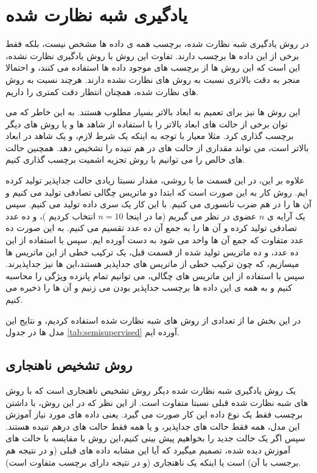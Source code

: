 \section{یادگیری شبه نظارت شده}

در روش یادگیری شبه نظارت شده، برچسب همه ی داده ها مشخص نیست، بلکه فقط برخی از این داده ها برچسب دارند. تفاوت این روش با روش یادگیری نظارت نشده، این است که این روش ها از برچسب های موجود داده ها استفاده می کنند، و احتمالا منجر به دقت بالاتری نسبت به روش های نظارت نشده دارند. هرچند نسبت به روش های نظارت شده، همچنان انتظار دقت  کمتری را داریم.

این روش ها نیز برای تعمیم به ابعاد بالاتر بسیار مطلوب هستند. به این خاطر که می توان برخی از حالت های ابعاد بالاتر را با استفاده از شاهد ها و یا روش های دیگر برچسب گذاری کرد. مثلا معیار
با توجه به اینکه یک شرط لازم، و یک شاهد در ابعاد بالاتر است، می تواند مقداری از حالت های در هم تنیده را تشخیص دهد. همچنین حالت های خالص را می توانیم با روش تجزیه اشمیت برچسب گذاری کنیم.

علاوه بر این، در این قسمت ما با روشی، مقدار نسبتا زیادی حالت جداپذیر تولید کرده ایم. روش کار به این صورت است که
ابتدا دو ماتریس چگالی تصادفی تولید می کنیم و آن ها را در هم ضرب تانسوری می کنیم. با این کار یک سری داده تولید می کنیم. سپس یک آرایه ی
$n$
عضوی در نظر می گیریم (‌ما در اینجا
$n=10$
انتخاب کردیم
)،
و ده عدد تصادفی تولید کرده و آن ها را به جمع آن ده عدد تقسیم می کنیم. به این صورت ده عدد متفاوت که جمع آن ها واحد می شود به دست آورده ایم. سپس با استفاده از این ده عدد، و ده ماتریس تولید شده از قسمت قبل، یک ترکیب خطی از این ماتریس ها میسازیم، که چون ترکیب خطی از ماتریس های جداپذیر هستند،‌این ها نیز جداپذیرند. سپس با استفاده از این ماتریس های چگالی، می توانیم تمام پانزده ویژگی را محاسبه کنیم و به همه ی این داده ها برچسب جداپذیر بودن می زنیم و آن ها را ذخیره می کنیم.

در این بخش ما از تعدادی از روش های شبه نظارت شده استفاده کردیم، و نتایج این مدل ها در جدول
\ref{tab:semisupervised}
آورده ایم.

\subsection{روش تشخیص ناهنجاری}

یک روش یادگیری شبه نظارت شده دیگر روش تشخیص ناهنجاری است که با روش های شبه نظارت شده قبلی نسبتا متفاوت است. از این نظر که در این روش، با داشتن برچسب فقط یک نوع داده این کار صورت می گیرد. یعنی داده های مورد نیاز آموزش این مدل، همه فقط حالت های جداپذیر، و یا همه فقط حالت های درهم تنیده هستند. سپس اگر یک حالت جدید را بخواهیم پیش بینی کنیم،‌این روش با مقایسه با حالت های آموزش دیده شده، تصمیم میگیرد که آیا این مشابه داده های قبلی (و در نتیجه هم برجسب با آن) است یا اینکه یک ناهنجاری (و در نتیجه دارای برچسب متفاوت است).

